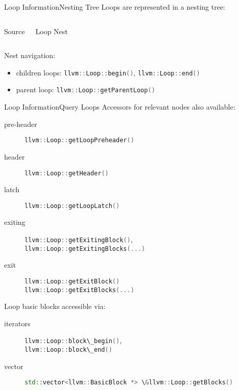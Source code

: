 \documentclass[10pt,mathserif]{beamer}
\newcommand{\cinput}[1]{}
\newcommand{\cppinline}[1]{\lstinline[language=C++]!#1!}
\begin{document}
\begin{frame}{Loop Information}{Nesting Tree}
Loops are represented in a \alert{nesting tree}:

\begin{columns}[t]
\begin{block}{Source}
\centering
\cinput{snippet/02/loop-nest.c}
\end{block}

\begin{block}{Loop Nest}
\centering

\end{block}
\end{columns}

Nest navigation:

\begin{itemize}
\item children loops: \cppinline{llvm::Loop::begin()},
      \cppinline{llvm::Loop::end()}
\item parent loop: \cppinline{llvm::Loop::getParentLoop()}
\end{itemize}
\end{frame}

\begin{frame}{Loop Information}{Query Loops}
Accessors for relevant nodes also available:

\begin{description}
\item[pre-header] \cppinline{llvm::Loop::getLoopPreheader()}
\item[header] \cppinline{llvm::Loop::getHeader()}
\item[latch] \cppinline{llvm::Loop::getLoopLatch()}
\item[exiting] \cppinline{llvm::Loop::getExitingBlock()}, \\
               \cppinline{llvm::Loop::getExitingBlocks(...)}
\item[exit] \cppinline{llvm::Loop::getExitBlock()} \\
            \cppinline{llvm::Loop::getExitBlocks(...)}
\end{description}

\vfill
Loop basic blocks accessible via:

\begin{description}
\item[iterators] \cppinline{llvm::Loop::block\_begin()}, \\
                 \cppinline{llvm::Loop::block\_end()}
\item[vector]
      \cppinline{std::vector<llvm::BasicBlock *> \&llvm::Loop::getBlocks()}
\end{description}
\end{frame}
\end{document}
